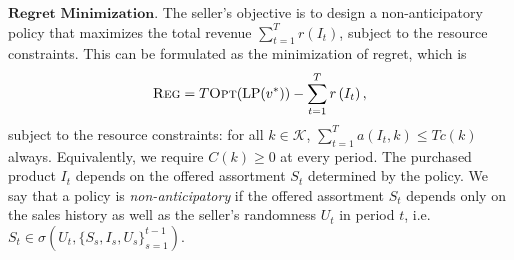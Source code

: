 \documentclass{article}
\theoremstyle{definition}
\newcommand{\KKK}{\mathcal{K}}
\newcommand{\NNN}{\mathcal{N}}
\newcommand{\SSS}{\mathcal{S}}
\begin{document}
$\textbf{Regret Minimization. }$The seller's objective is to design a non-anticipatory policy that maximizes the total revenue $\sum^T_{t = 1}r(I_t)$, subject to the resource constraints. This can be formulated as the minimization of regret, which is
\begin{equation}\label{eq:regret}
\text{{\sc Reg}} = T\text{{\sc Opt}}(\text{LP}(v^*)) - \sum^T_{t = 1}r\left(I_t\right),
\end{equation}
subject to the resource constraints: for all $k\in \KKK$, $\sum^T_{t = 1}a(I_t, k) \leq Tc(k)$ always. Equivalently, we require $C(k) \geq 0$ at every period. %
The purchased product $I_t$ depends on the offered assortment $S_t$ determined by the policy. We say that a policy is \emph{non-anticipatory} if the offered assortment $S_t$ depends only on the sales history as well as the seller's randomness $U_t$ in period $t$, i.e. $S_t \in \sigma(U_t, \{S_s, I_s, U_s\}^{t-1}_{s=1})$. 
\end{document}
